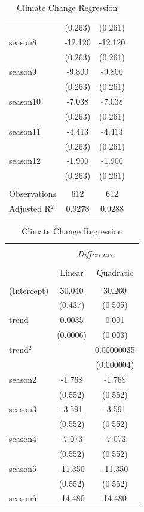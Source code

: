 \documentclass[12pt]{article}
\begin{document}
{\begin{table}[H]
{\begin{tabular}{@{\extracolsep{5pt}}lcc}
  & (0.263) & (0.261) \\ 
season8 & -12.120 & -12.120 \\ 
  & (0.263) & (0.261) \\ 
season9 & -9.800 & -9.800 \\ 
  & (0.263) & (0.261) \\ 
season10 & -7.038 & -7.038 \\ 
  & (0.263) & (0.261) \\ 
season11 & -4.413 & -4.413 \\ 
  & (0.263) & (0.261) \\ 
season12 & -1.900 & -1.900 \\ 
  & (0.263) & (0.261) \\ 
\hline \\[-1.8ex] 
Observations & 612 & 612 \\ 
Adjusted R$^{2}$ & 0.9278 & 0.9288 \\ 
\hline 
\hline
\end{tabular} 
}
\hfill
\parbox{.45\linewidth}{
  \caption{Climate Change Regression} 
  \label{} 
\begin{tabular}{@{\extracolsep{5pt}}lcc} 
\\[-1.8ex]\hline 
\hline \\[-1.8ex] 
 & \multicolumn{2}{c}{\textit{Difference}} \\ 
\cline{2-3} 
\\[-1.8ex] & Linear & Quadratic \\ 
\hline \\[-1.8ex] 
(Intercept) & 30.040 & 30.260 \\ 
  & (0.437) & (0.505) \\ 
trend & 0.0035 & 0.001 \\ 
  & (0.0006) & (0.003) \\ 
trend$^2$ &  & 0.00000035 \\ 
  &  & (0.000004) \\ 
season2 & -1.768 & -1.768 \\ 
  & (0.552) & (0.552) \\ 
season3 & -3.591 & -3.591 \\ 
  & (0.552) & (0.552) \\ 
season4 & -7.073 & -7.073 \\ 
  & (0.552) & (0.552) \\ 
season5 & -11.350 & -11.350 \\ 
  & (0.552) & (0.552) \\ 
season6 & -14.480 & 14.480 \\ 

\end{tabular}}
\end{table}}
\end{document}
